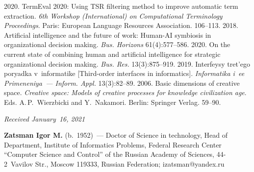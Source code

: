 \begin{multicols}{2}
{{\begin{thebibliography}{99}
 2020. TermEval 2020: Using TSR 
filtering method to improve automatic term extraction. \textit{6th  Workshop (International) on 
Computational Terminology Proceedings}. Paris: European Language Resources Association.  
106--113.
 2018. Artificial intelligence and the future of work: Human-AI symbiosis 
in organizational decision making. \textit{Bus. Horizons} 61(4):577--586.
 2020. On the current state of combining human 
and artificial intelligence for strategic organizational decision making. \textit{Bus. 
Res.} 13(3):875--919.
 2019. Interfeysy tret'ego poryadka v~informatike [Third-order interfaces 
in informatics]. \textit{Informatika i~ee Primeneniya~--- Inform. Appl.} 13(3):82--89.
 2006. Basic dimensions of creative space. 
\textit{Creative space: Models of creative processes for knowledge civilization age}. Eds. 
A.\,P.~Wierzbicki and Y.~Nakamori. Berlin: Springer Verlag. 59--90. 
\end{thebibliography}

 }
 }

\end{multicols}

\vspace*{-3pt}

  \hfill{\small\textit{Received January~16, 2021}}




\Contrl

\noindent
\textbf{Zatsman Igor M.} (b.\ 1952)~--- Doctor of Science in technology, Head of Department, 
Institute of Informatics Problems, Federal Research Center ``Computer Science and Control'' of 
the Russian Academy of Sciences, 44-2~Vavilov Str., Moscow 119333, Russian Federation; 
\mbox{izatsman@yandex.ru}

\label{end\stat}

\renewcommand{\bibname}{\protect\rm Литература}